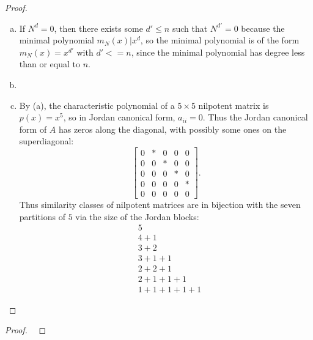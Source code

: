 \documentclass{article}
\begin{document}
\begin{proof} ~
  \begin{enumerate}[(a)]
    \item If $N^d = 0$, then there exists some $d' \leq n$ such that
    $N^{d'} = 0$ because the minimal polynomial $m_N(x) | x^d$, so the minimal
    polynomial is of the form $m_N(x) = x^{d'}$ with $d' <= n$, since the
    minimal polynomial has degree less than or equal to $n$.
    \item
    \item By (a), the characteristic polynomial of a $5 \times 5$ nilpotent
    matrix is $p(x) = x^5$, so in Jordan canonical form, $a_{ii} = 0$. Thus
    the Jordan canonical form of $A$ has
    zeros along the diagonal, with possibly some ones on the superdiagonal: \[
      \begin{bmatrix}
        0 & * & 0 & 0 & 0 \\
        0 & 0 & * & 0 & 0 \\
        0 & 0 & 0 & * & 0 \\
        0 & 0 & 0 & 0 & * \\
        0 & 0 & 0 & 0 & 0
      \end{bmatrix}.
    \] Thus similarity classes of nilpotent matrices are in bijection with the
    seven partitions of $5$ via the size of the Jordan blocks: \begin{align*}
        &5 \\
        &4 + 1 \\
        &3 + 2 \\
        &3 + 1 + 1 \\
        &2 + 2 + 1 \\
        &2 + 1 + 1 + 1\\
        &1 + 1 + 1 + 1 + 1
    \end{align*}
  \end{enumerate}
\end{proof}

\begin{problem}{4} %
\end{problem}

\begin{proof} ~
\end{proof}
\begin{problem}{5} %
\end{problem}
\end{document}
